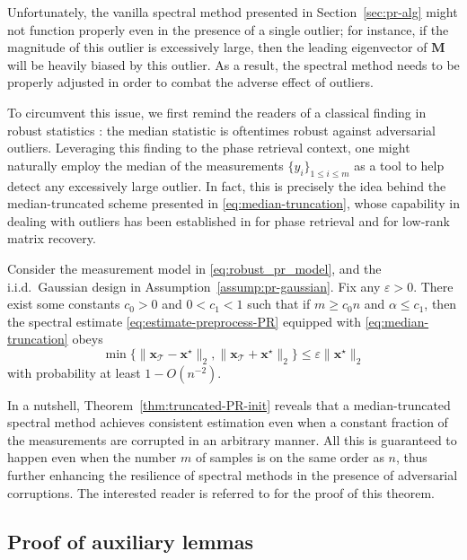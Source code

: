 Unfortunately, the vanilla spectral method presented in Section~\ref{sec:pr-alg} might not function properly
even in the presence of a single outlier; for instance, if the magnitude of this outlier is excessively large, then the leading eigenvector of $\bm{M}$ will be heavily biased by this outlier.
As a result, the spectral method needs to be properly adjusted in order to combat  the adverse effect of outliers.



To circumvent this issue,  we first remind the readers of a classical finding in robust statistics \citep{huber2004robust}: the median statistic is oftentimes robust against adversarial outliers.
Leveraging this finding to the phase retrieval context,
one might naturally employ the median of the measurements $\{y_i\}_{1\leq i\leq m}$ as a tool to help detect any excessively large outlier. In fact, this is precisely the idea behind the median-truncated scheme presented
in \eqref{eq:median-truncation}, whose capability in dealing with outliers has been established in \citet{zhang2016provable} for phase retrieval and \citet{li2017nonconvex} for low-rank matrix recovery.
%
\begin{theorem}
	\label{thm:truncated-PR-init}
	Consider the measurement model in \eqref{eq:robust_pr_model},
	and the i.i.d.~Gaussian design in Assumption~\ref{assump:pr-gaussian}.
	Fix any  $\varepsilon > 0$. There exist some constants  $c_0>0$ and $0<c_1<1$ such that
	if  $m\geq c_{0}n$ and $\alpha\leq c_1$,
	then the spectral estimate \eqref{eq:estimate-preprocess-PR} equipped with \eqref{eq:median-truncation} obeys
%
\[
	\min \{ \| \bm{x}_{\mathcal{T}} - \bm{x}^{\star}\|_2, \| \bm{x}_{\mathcal{T}} + \bm{x}^{\star}\|_2 \}  \le \varepsilon \| \bm{x}^{\star} \|_2
\]
%
with probability at least $1 - O(n^{-2})$.
\end{theorem}
%
In a nutshell, Theorem~\ref{thm:truncated-PR-init} reveals that a median-truncated spectral method  achieves consistent estimation even when a constant fraction of the measurements are corrupted in an arbitrary manner.  All this is guaranteed to happen even when the number $m$ of samples is on the same order as $n$,  thus further enhancing the resilience of spectral methods in the presence of adversarial corruptions. The interested reader is referred to \citet{zhang2016provable} for the proof of this theorem.





\subsection{Proof of auxiliary lemmas}
\label{sec:proof-auxiliary-lemmas-PR-L2}




